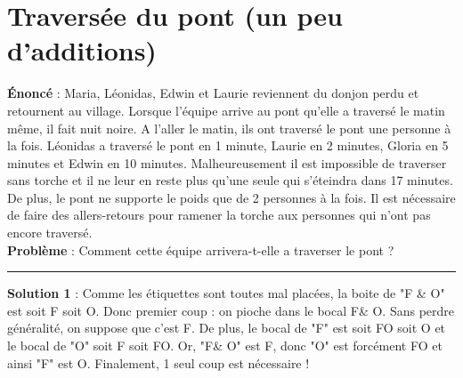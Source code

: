 \documentclass{article}
\begin{document}

 
\section{Traversée du pont (un peu d'additions) }

\textbf{Énoncé} : Maria, Léonidas, Edwin et Laurie reviennent du donjon perdu et retournent au village. Lorsque l'équipe arrive au pont qu'elle a traversé le matin même, il fait nuit noire. A l'aller le matin, ils ont traversé le pont une personne à la fois. Léonidas a traversé le pont en 1 minute, Laurie en 2 minutes, Gloria en 5 minutes et Edwin en 10 minutes. Malheureusement il est impossible de traverser sans torche et il ne leur en reste plus qu'une seule qui s'éteindra dans 17 minutes. De plus, le pont ne supporte le poids que de 2 personnes à la fois. Il est nécessaire de faire des allers-retours pour ramener la torche aux personnes qui n'ont pas encore traversé. \\

\textbf{Problème }: Comment cette équipe arrivera-t-elle a traverser le pont ? \\   
   
  
 
  
  

 \hrule
\hspace{3cm}




\textbf{Solution 1 } : Comme les  étiquettes sont toutes mal placées, la boite de "F \& O" est soit F soit O. Donc premier coup : on pioche dans le bocal F\& O. Sans perdre généralité, on suppose que c’est F. De plus, le bocal de "F" est soit FO soit O et le bocal de "O" soit F soit FO. Or, "F\& O" est F, donc "O" est forcément FO et ainsi "F" est O. Finalement, 1 seul coup est nécessaire ! \\
\end{document}
